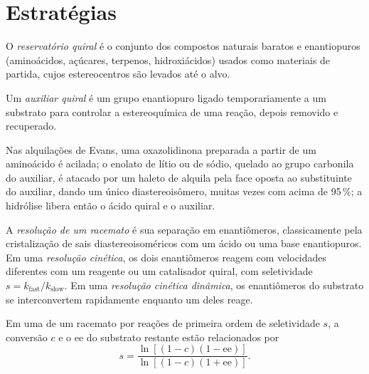 \section{Estratégias}

\begin{definition}\label{def:b3:asymmetric-synthesis:chiral-pool}
O \emph{reservatório quiral} é o conjunto dos compostos naturais
baratos e enantiopuros (aminoácidos, açúcares, terpenos, hidroxiácidos) usados como
materiais de partida, cujos estereocentros são levados até o alvo.
\end{definition}

\begin{definition}\label{def:b3:asymmetric-synthesis:auxiliary}
Um \emph{auxiliar quiral} é um grupo enantiopuro
ligado temporariamente a um substrato para controlar a estereoquímica de uma
reação, depois removido e recuperado.
\end{definition}

Nas alquilações de Evans, uma oxazolidinona preparada a partir de um aminoácido é acilada;
o enolato de lítio ou de sódio, quelado ao grupo carbonila do auxiliar, é
atacado por um haleto de alquila pela face oposta ao substituinte do auxiliar,
dando um único diastereoisômero, muitas vezes com  acima de 95\,\%; a hidrólise libera então o
ácido quiral e o auxiliar.

\begin{definition}[Resoluções]\label{def:b3:asymmetric-synthesis:resolution}
A \emph{resolução de um racemato} é sua
separação em enantiômeros, classicamente pela cristalização de sais diastereoisoméricos
com um ácido ou uma base enantiopuros. Em uma \emph{resolução cinética},
os dois enantiômeros reagem com velocidades diferentes com um reagente ou um
catalisador quiral, com seletividade $s = k_{\mathrm{fast}}/k_{\mathrm{slow}}$. Em uma \emph{resolução cinética
dinâmica}, os enantiômeros do substrato
se interconvertem rapidamente enquanto um deles reage.
\end{definition}

\begin{theorem}\label{thm:b3:asymmetric-synthesis:kagan}
Em uma  de um racemato por reações de primeira ordem de seletividade $s$,
a conversão $c$ e o ee do substrato restante estão relacionados por
\[
  s = \frac{\ln[(1 - c)(1 - \mathrm{ee})]}{\ln[(1 - c)(1 + \mathrm{ee})]}.
\]
\end{theorem}

